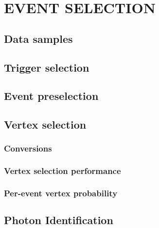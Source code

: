 \chapter{EVENT SELECTION}
\section{Data samples}
\section{Trigger selection}
\section{Event preselection}
\section{Vertex selection}
\subsection{Conversions}
\subsection{Vertex selection performance}
\subsection{Per-event vertex probability}
\section{Photon Identification}
